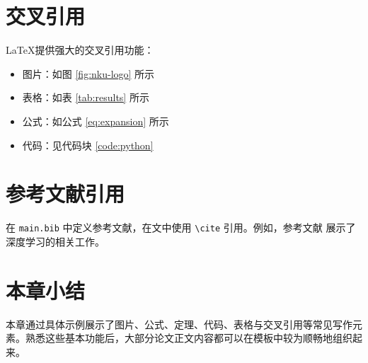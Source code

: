 \section{交叉引用}

\LaTeX 提供强大的交叉引用功能：

\begin{itemize}
    \item 图片：如图 \ref{fig:nku-logo} 所示
    \item 表格：如表 \ref{tab:results} 所示
    \item 公式：如公式 \eqref{eq:expansion} 所示
    \item 代码：见代码块 \ref{code:python}
\end{itemize}

\section{参考文献引用}

在 \texttt{main.bib} 中定义参考文献，在文中使用 \texttt{\textbackslash cite} 引用。例如，参考文献 \cite{Goodfellow2016,LeCun2015} 展示了深度学习的相关工作。

\section{本章小结}

本章通过具体示例展示了图片、公式、定理、代码、表格与交叉引用等常见写作元素。熟悉这些基本功能后，大部分论文正文内容都可以在模板中较为顺畅地组织起来。
